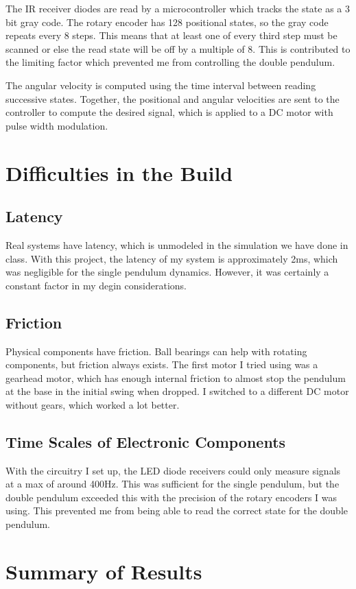 \documentclass[conference]{IEEEtran}
\begin{document}
The IR receiver diodes are read by a microcontroller which tracks the state as a 3 bit gray code. The rotary encoder has 128 positional states, so the gray code repeats every 8 steps. This means that at least one of every third step must be scanned or else the read state will be off by a multiple of 8. This is contributed to the limiting factor which prevented me from controlling the double pendulum.

The angular velocity is computed using the time interval between reading successive states. Together, the positional and angular velocities are sent to the controller to compute the desired signal, which is applied to a DC motor with pulse width modulation.

\section{Difficulties in the Build}
\subsection{Latency}
Real systems have latency, which is unmodeled in the simulation we have done in class. With this project, the latency of my system is approximately 2ms, which was negligible for the single pendulum dynamics. However, it was certainly a constant factor in my degin considerations.

\subsection{Friction}
Physical components have friction. Ball bearings can help with rotating components, but friction always exists. The first motor I tried using was a gearhead motor, which has enough internal friction to almost stop the pendulum at the base in the initial swing when dropped. I switched to a different DC motor without gears, which worked a lot better.

\subsection{Time Scales of Electronic Components}
With the circuitry I set up, the LED diode receivers could only measure signals at a max of around 400Hz. This was sufficient for the single pendulum, but the double pendulum exceeded this with the precision of the rotary encoders I was using. This prevented me from being able to read the correct state for the double pendulum.

\section{Summary of Results}
\end{document}
